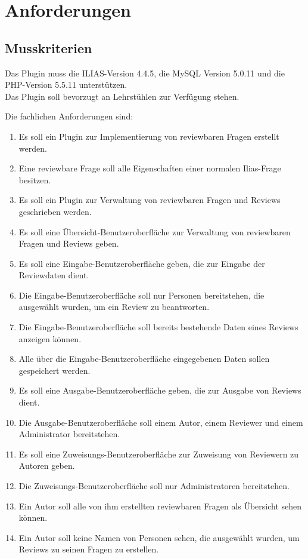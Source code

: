 \documentclass[a4paper]{scrreprt}
\begin{document}
\chapter{Anforderungen}

 
\section{Musskriterien}
Das Plugin muss die ILIAS-Version 4.4.5, die MySQL Version 5.0.11 und die PHP-Version 5.5.11 unterstützen.\\
Das Plugin soll bevorzugt an Lehrstühlen zur Verfügung stehen.

Die fachlichen Anforderungen sind:
\begin{enumerate}[label= FA \arabic*:]
\item Es soll ein Plugin zur Implementierung von reviewbaren Fragen erstellt werden.
\item Eine reviewbare Frage soll alle Eigenschaften einer normalen Ilias-Frage besitzen.
\item Es soll ein Plugin zur Verwaltung von reviewbaren Fragen und Reviews geschrieben werden.
\item Es soll eine Übersicht-Benutzeroberfläche zur Verwaltung von reviewbaren Fragen und Reviews geben.
\item Es soll eine Eingabe-Benutzeroberfläche geben, die zur Eingabe der Reviewdaten dient.
\item Die Eingabe-Benutzeroberfläche soll nur Personen bereitstehen, die ausgewählt wurden, um ein Review zu beantworten.
\item Die Eingabe-Benutzeroberfläche soll bereits bestehende Daten eines Reviews anzeigen können.
\item Alle über die Eingabe-Benutzeroberfläche eingegebenen Daten sollen gespeichert werden.
\item Es soll eine Ausgabe-Benutzeroberfläche geben, die zur Ausgabe von Reviews dient.
\item Die Ausgabe-Benutzeroberfläche soll einem Autor, einem Reviewer und einem Administrator bereitstehen.
\item Es soll eine Zuweisungs-Benutzeroberfläche zur Zuweisung von Reviewern zu Autoren geben.
\item Die Zuweisungs-Benutzeroberfläche soll nur Administratoren bereitstehen.
\item Ein Autor soll alle von ihm erstellten reviewbaren Fragen als Übersicht sehen können.
\item Ein Autor soll keine Namen von Personen sehen, die ausgewählt wurden, um Reviews zu seinen Fragen zu erstellen.

\end{enumerate}
\end{document}
